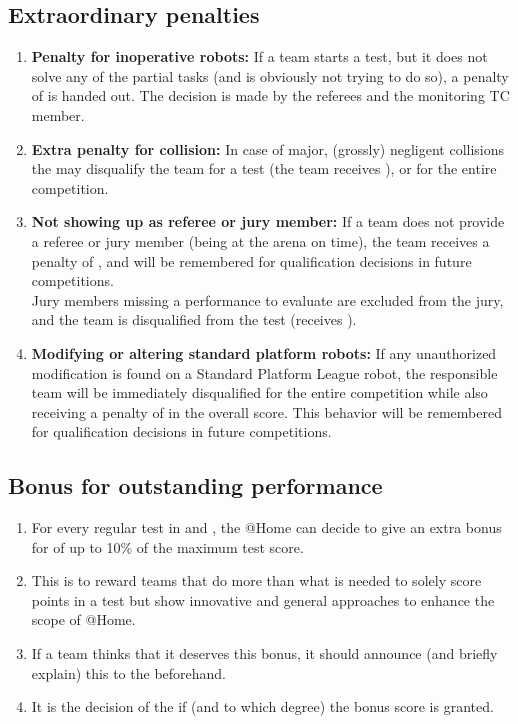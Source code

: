 \subsection{Extraordinary penalties}\label{rule:extraordinary_penalties}
\begin{enumerate}
	\item \textbf{Penalty for inoperative robots:} If a team starts a test, but it does not solve any of the partial tasks (and is obviously not trying to do so), a penalty of  is handed out. The decision is made by the referees and the monitoring TC member.  
	\item \textbf{Extra penalty for collision:} In case of major, (grossly) negligent collisions the  may disqualify the team for a test (the team receives ), or for the entire competition.
	\item \textbf{Not showing up as referee or jury member:} If a team does not provide a referee or jury member (being at the arena on time), the team receives a penalty of , and will be remembered for qualification decisions in future competitions.\\
	Jury members missing a performance to evaluate are excluded from the jury, and the team is disqualified from the test (receives ).
	\item \textbf{Modifying or altering standard platform robots:} If any unauthorized modification is found on a Standard Platform League robot, the responsible team will be immediately disqualified for the entire competition while also receiving a penalty of  in the overall score. This behavior will be remembered for qualification decisions in future competitions.\\
\end{enumerate}

\subsection{Bonus for outstanding performance}\label{rule:outstanding_performance}
\begin{enumerate}
	\item For every regular test in  and , the @Home  can decide to give an extra bonus for  of up to 10\% of the maximum test score. 
	\item This is to reward teams that do more than what is needed to solely score points in a test but show innovative and general approaches to enhance the scope of @Home. 
	\item If a team thinks that it deserves this bonus, it should announce (and briefly explain) this to the  beforehand.
	\item It is the decision of the  if (and to which degree) the bonus score is granted.
\end{enumerate}


